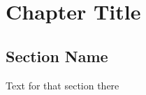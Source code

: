 \documentclass[letterpaper,10pt,twoside,twocolumn,openany]{book}
\begin{document}
	
	\chapter{Chapter Title}
	
	\section{Section Name}
	Text for that section there
\end{document}
